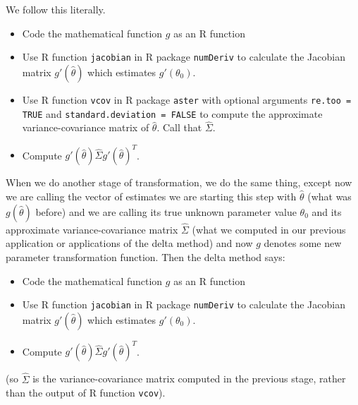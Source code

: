 \documentclass[11pt]{article}
\let\code=\texttt
\begin{document}
We follow this literally.
\begin{itemize}
\item Code the mathematical function $g$ as an R function
\item Use R function \code{jacobian} in R package \code{numDeriv} to
    calculate the Jacobian matrix $g'(\hat{\theta})$ which estimates
    $g'(\theta_0)$.
\item Use R function \code{vcov} in R package \code{aster} with optional
    arguments \code{re.too = TRUE} and \code{standard.deviation = FALSE}
    to compute the approximate variance-covariance matrix of $\hat{\theta}$.
    Call that $\widehat{\Sigma}$.
\item Compute $g'(\hat{\theta}) \widehat{\Sigma} g'(\hat{\theta})^T$.
\end{itemize}

When we do another stage of transformation, we do the same thing, except
now we are calling the vector of estimates we are starting this step with
$\hat{\theta}$ (what was $g(\hat{\theta})$ before) and we are calling its
true unknown parameter value $\theta_0$ and its
approximate variance-covariance matrix $\widehat{\Sigma}$ (what we computed
in our previous application or applications of the delta method) and now
$g$ denotes some new parameter transformation function.  Then the delta
method says:
\begin{itemize}
\item Code the mathematical function $g$ as an R function
\item Use R function \code{jacobian} in R package \code{numDeriv} to
    calculate the Jacobian matrix $g'(\hat{\theta})$ which estimates
    $g'(\theta_0)$.
\item Compute $g'(\hat{\theta}) \widehat{\Sigma} g'(\hat{\theta})^T$.
\end{itemize}
(so $\widehat{\Sigma}$ is the variance-covariance matrix computed in the
previous stage, rather than the output of R function \code{vcov}).
\end{document}
